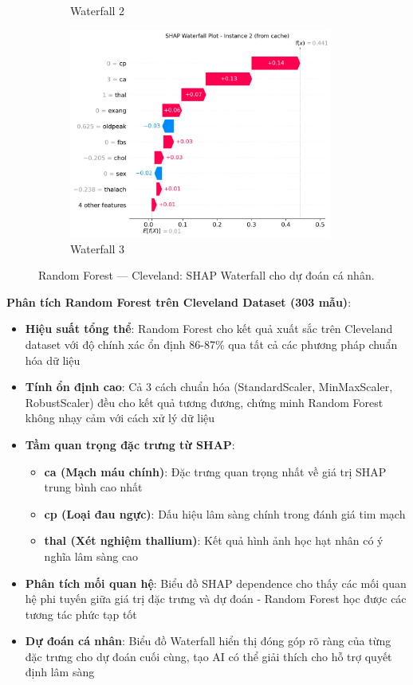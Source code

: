 \begin{figure}[H]
\begin{subfigure}[b]{0.31\textwidth}
\caption{Waterfall 2}
\label{fig:rf_clev_waterfall2}
\end{subfigure}\hfill
\begin{subfigure}[b]{0.31\textwidth}
\centering
\includegraphics[width=0.95\textwidth]{Result/cleveland_dataset/RF/SHAP/Waterfall 3.png}
\caption{Waterfall 3}
\label{fig:rf_clev_waterfall3}
\end{subfigure}
\caption{Random Forest — Cleveland: SHAP Waterfall cho dự đoán cá nhân.}
\label{fig:rf_clev_waterfalls}
\end{figure}

\textbf{Phân tích Random Forest trên Cleveland Dataset (303 mẫu)}:
\begin{itemize}[leftmargin=*]
    \item \textbf{Hiệu suất tổng thể}: Random Forest cho kết quả xuất sắc trên Cleveland dataset với độ chính xác ổn định 86-87\% qua tất cả các phương pháp chuẩn hóa dữ liệu
    \item \textbf{Tính ổn định cao}: Cả 3 cách chuẩn hóa (StandardScaler, MinMaxScaler, RobustScaler) đều cho kết quả tương đương, chứng minh Random Forest không nhạy cảm với cách xử lý dữ liệu
    \item \textbf{Tầm quan trọng đặc trưng từ SHAP}: 
    \begin{itemize}[leftmargin=*]
        \item \textbf{ca (Mạch máu chính)}: Đặc trưng quan trọng nhất về giá trị SHAP trung bình cao nhất
        \item \textbf{cp (Loại đau ngực)}: Dấu hiệu lâm sàng chính trong đánh giá tim mạch
        \item \textbf{thal (Xét nghiệm thallium)}: Kết quả hình ảnh học hạt nhân có ý nghĩa lâm sàng cao
    \end{itemize}
    \item \textbf{Phân tích mối quan hệ}: Biểu đồ SHAP dependence cho thấy các mối quan hệ phi tuyến giữa giá trị đặc trưng và dự đoán - Random Forest học được các tương tác phức tạp tốt
    \item \textbf{Dự đoán cá nhân}: Biểu đồ Waterfall hiển thị đóng góp rõ ràng của từng đặc trưng cho dự đoán cuối cùng, tạo AI có thể giải thích cho hỗ trợ quyết định lâm sàng
\end{itemize}

